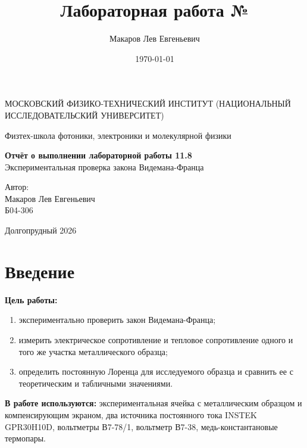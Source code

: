 \documentclass[a4paper,12pt]{article}
\author{Макаров Лев Евгеньевич}
\title{Лабораторная работа №\labnumber\\\labname}
\date{\today}
\newcommand\labname{Экспериментальная проверка закона Видемана-Франца}
\newcommand\labnumber{11.8}
\begin{document}
\begin{titlepage}
    \begin{center}
        {\large МОСКОВСКИЙ ФИЗИКО-ТЕХНИЧЕСКИЙ ИНСТИТУТ (НАЦИОНАЛЬНЫЙ ИССЛЕДОВАТЕЛЬСКИЙ УНИВЕРСИТЕТ)}
    \end{center}
    \begin{center}
        {\large Физтех-школа фотоники, электроники и молекулярной физики}
    \end{center}

    \vspace{4.5cm}
    {\huge
        \begin{center}
            {\bf Отчёт о выполнении лабораторной работы \labnumber}\\
            \labname
        \end{center}
    }
    \vspace{2cm}
    \begin{flushright}
        {\LARGE Автор:\\ Макаров Лев Евгеньевич\\
        \vspace{0.2cm}
        Б04-306}
    \end{flushright}
    \vspace{8cm}
    \begin{center}
        Долгопрудный 2026
    \end{center}
\end{titlepage}

\section{Введение}

\textbf{Цель работы:}
\begin{enumerate}
    \item экспериментально проверить закон Видемана-Франца;
    \item измерить электрическое сопротивление и тепловое сопротивление одного и того же участка металлического образца;
    \item определить постоянную Лоренца для исследуемого образца и сравнить ее с теоретическим и табличными значениями.
\end{enumerate}

\textbf{В работе используются:} экспериментальная ячейка с металлическим образцом и компенсирующим экраном, два источника постоянного тока INSTEK GPR30H10D, вольтметры В7-78/1, вольтметр В7-38, медь-константановые термопары.
\end{document}
